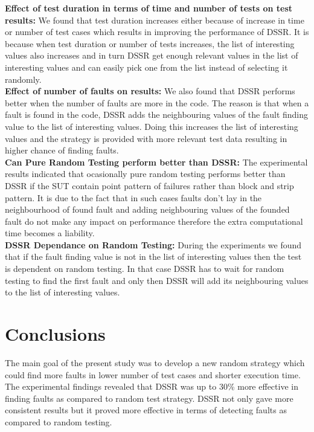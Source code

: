 \documentclass[10pt, conference, compsocconf]{IEEEtran}
\begin{document}
\textbf{Effect of test duration in terms of time and number of tests on test results:} 
We found that test duration increases either because of  increase in time or number of test cases which results in improving the performance of DSSR. It is because when test duration or number of tests increases, the list of interesting values also increases and in turn DSSR get enough relevant values in the list of interesting values and can easily pick one from the list instead of selecting it randomly.\\

\textbf{Effect of number of faults on results:} 
We also found that DSSR performs better when the number of faults are more in the code. The reason is that when a fault is found in the code, DSSR adds the neighbouring values of the fault finding value to the list of interesting values. Doing this increases the list of interesting values and the strategy is provided with more relevant test data resulting in higher chance of finding faults.\\

\textbf{Can Pure Random Testing perform better than DSSR:}
The experimental results indicated that ocasionally pure random testing performs better than DSSR if the SUT contain point pattern of failures rather than block and strip pattern. It is due to the fact that in such cases faults don't lay in the neighbourhood of found fault and adding neighbouring values of the founded fault do not make any impact on performance therefore the extra computational time becomes a liability.\\

\textbf{DSSR Dependance on Random Testing:}
During the experiments we found that if the fault finding value is not in the list of interesting values then the test is dependent on random testing. In that case DSSR has to wait for random testing to find the first fault and only then DSSR will add its neighbouring values to the list of interesting values.


\section{Conclusions}\label{sec:conc}

The main goal of the present study was to develop a new random strategy which could find more faults in lower number of test cases and shorter execution time. The experimental findings revealed that DSSR was up to 30\% more effective in finding faults as compared to random test strategy. DSSR not only gave more consistent results but it proved more effective in terms of detecting faults as compared to random testing.
\end{document}
